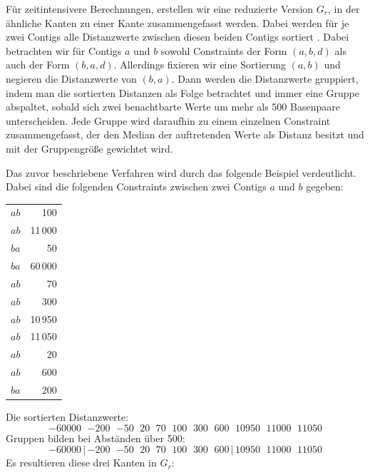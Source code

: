 Für zeitintensivere Berechnungen, erstellen wir eine reduzierte Version $G_r$, in der ähnliche Kanten 
zu einer Kante zusammengefasst werden. Dabei werden für je zwei Contigs alle Distanzwerte zwischen diesen beiden Contigs sortiert
. Dabei betrachten wir für Contigs $a$ und $b$ sowohl Constraints der Form $(a, b, d)$ als auch der Form $(b, a, d)$. Allerdings fixieren wir eine Sortierung $(a, b)$ und negieren die Distanzwerte von $(b, a)$.
Dann werden die Distanzwerte gruppiert, indem man die sortierten Distanzen als Folge betrachtet und immer eine Gruppe abspaltet, sobald sich zwei benachtbarte Werte um mehr als 500 Basenpaare unterscheiden. Jede Gruppe wird daraufhin zu einem einzelnen Constraint zusammengefasst, der den Median der auftretenden Werte als Distanz besitzt und mit der Gruppengröße gewichtet wird.

Das zuvor beschriebene Verfahren wird durch das folgende Beispiel verdeutlicht. Dabei sind die folgenden Constraints zwischen zwei Contigs $a$ und $b$ gegeben:
\begin{center}
\begin{tabular}{lr}
$a$\quad $b$\quad &100\\
$a$\quad $b$\quad &11\,000\\
$b$\quad $a$\quad &50\\
$b$\quad $a$\quad &60\,000\\
$a$\quad $b$\quad &70\\
$a$\quad $b$\quad &300\\
$a$\quad $b$\quad &10\,950\\
$a$\quad $b$\quad &11\,050\\
$a$\quad $b$\quad &20\\
$a$\quad $b$\quad &600\\
$b$\quad $a$\quad &200
\end{tabular}
\end{center}
Die sortierten Distanzwerte:
\[-60000\ \ \,{-200}\ \ \,{-50}\ \ \,20\ \ \,70\ \ \,100\ \ \,300\ \ \,600\ \ \,10950\ \ \,11000\ \ \,11050\]
Gruppen bilden bei Abständen über 500:
\[-60000\,|\, {-200}\ \ \,{-50}\ \ \,20\ \ \,70\ \ \,100\ \ \,300\ \ \,600\, |\, 10950\ \ \,11000\ \ \,11050\]
Es resultieren diese drei Kanten in $G_r$:

